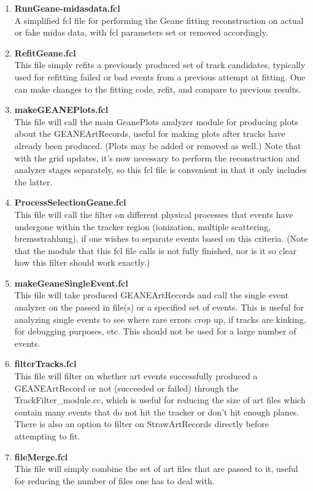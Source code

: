     \begin{enumerate}

      \item{\bf{RunGeane-midasdata.fcl}} \\
      A simplified fcl file for performing the Geane fitting reconstruction on actual or fake midas data, with fcl parameters set or removed accordingly.

      \item{\bf{RefitGeane.fcl}} \\
      This file simply refits a previously produced set of track candidates, typically used for refitting failed or bad events from a previous attempt at fitting. One can make changes to the fitting code, refit, and compare to previous results.

      \item{\bf{makeGEANEPlots.fcl}} \\
      This file will call the main GeanePlots analyzer module for producing plots about the GEANEArtRecords, useful for making plots after tracks have already been produced. (Plots may be added or removed as well.) Note that with the grid updates, it's now necessary to perform the reconstruction and analyzer stages separately, so this fcl file is convenient in that it only includes the latter.

      \item{\bf{ProcessSelectionGeane.fcl}} \\
      This file will call the filter on different physical processes that events have undergone within the tracker region (ionization, multiple scattering, bremsstrahlung), if one wishes to separate events based on this criteria. (Note that the module that this fcl file calls is not fully finished, nor is it so clear how this filter should work exactly.)

      \item{\bf{makeGeaneSingleEvent.fcl}} \\
      This file will take produced GEANEArtRecords and call the single event analyzer on the passed in file(s) or a specified set of events. This is useful for analyzing single events to see where rare errors crop up, if tracks are kinking, for debugging purposes, etc. This should not be used for a large number of events.

      \item{\bf{filterTracks.fcl}} \\
      This file will filter on whether art events successfully produced a GEANEArtRecord or not (succeeded or failed) through the TrackFilter\_module.cc, which is useful for reducing the size of art files which contain many events that do not hit the tracker or don't hit enough planes. There is also an option to filter on StrawArtRecords directly before attempting to fit.

      \item{\bf{fileMerge.fcl}} \\
      This file will simply combine the set of art files that are passed to it, useful for reducing the number of files one has to deal with.

    \end{enumerate}



